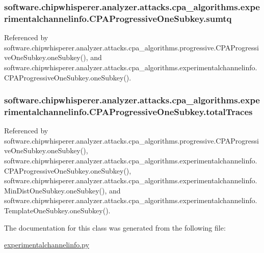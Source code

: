 \subsubsection[{sumtq}]{\setlength{\rightskip}{0pt plus 5cm}software.\+chipwhisperer.\+analyzer.\+attacks.\+cpa\+\_\+algorithms.\+experimentalchannelinfo.\+C\+P\+A\+Progressive\+One\+Subkey.\+sumtq}\label{classsoftware_1_1chipwhisperer_1_1analyzer_1_1attacks_1_1cpa__algorithms_1_1experimentalchannelinfo_1_1CPAProgressiveOneSubkey_ac59fcc51f10d03bcc3f47c516d6c683d}


Referenced by software.\+chipwhisperer.\+analyzer.\+attacks.\+cpa\+\_\+algorithms.\+progressive.\+C\+P\+A\+Progressive\+One\+Subkey.\+one\+Subkey(), and software.\+chipwhisperer.\+analyzer.\+attacks.\+cpa\+\_\+algorithms.\+experimentalchannelinfo.\+C\+P\+A\+Progressive\+One\+Subkey.\+one\+Subkey().

\hypertarget{classsoftware_1_1chipwhisperer_1_1analyzer_1_1attacks_1_1cpa__algorithms_1_1experimentalchannelinfo_1_1CPAProgressiveOneSubkey_a1f9a90b97cee6e8624329c0de7c2e292}{}
\subsubsection[{total\+Traces}]{\setlength{\rightskip}{0pt plus 5cm}software.\+chipwhisperer.\+analyzer.\+attacks.\+cpa\+\_\+algorithms.\+experimentalchannelinfo.\+C\+P\+A\+Progressive\+One\+Subkey.\+total\+Traces}\label{classsoftware_1_1chipwhisperer_1_1analyzer_1_1attacks_1_1cpa__algorithms_1_1experimentalchannelinfo_1_1CPAProgressiveOneSubkey_a1f9a90b97cee6e8624329c0de7c2e292}


Referenced by software.\+chipwhisperer.\+analyzer.\+attacks.\+cpa\+\_\+algorithms.\+progressive.\+C\+P\+A\+Progressive\+One\+Subkey.\+one\+Subkey(), software.\+chipwhisperer.\+analyzer.\+attacks.\+cpa\+\_\+algorithms.\+experimentalchannelinfo.\+C\+P\+A\+Progressive\+One\+Subkey.\+one\+Subkey(), software.\+chipwhisperer.\+analyzer.\+attacks.\+cpa\+\_\+algorithms.\+experimentalchannelinfo.\+Min\+Dist\+One\+Subkey.\+one\+Subkey(), and software.\+chipwhisperer.\+analyzer.\+attacks.\+cpa\+\_\+algorithms.\+experimentalchannelinfo.\+Template\+One\+Subkey.\+one\+Subkey().



The documentation for this class was generated from the following file\+:\begin{DoxyCompactItemize}
\item 
\hyperlink{experimentalchannelinfo_8py}{experimentalchannelinfo.\+py}\end{DoxyCompactItemize}

